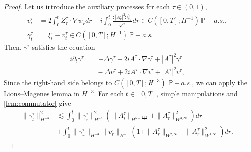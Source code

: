 \documentclass[a4paper,10pt]{amsart}
\newcommand{\wick}[1]{:\mathrel{#1}:}
\newcommand{\Bk}{\color{black}}
\newcommand{\Rd}{\color{red}}
\theoremstyle{remark}
\numberwithin{equation}{section}
\begin{document}
\begin{proof}
    Let us introduce the auxiliary processes for each $\tau \in (0,1),$  
    \begin{align*}
        v^{\tau}_t&=2\int_0^t Z^{\tau}_r\cdot\nabla\bar{\psi}_r dr-i\int_0^t \frac{\wick{|A^\tau_r|^2}\bar{\psi}_r}{\sqrt{\tau}} dr\in C([0,T];H^{-1})\ \mathbb{P}-a.s.,\\
        \gamma^{\tau}_t&=\xi^{\tau}_t-v^{\tau}_t\in C([0,T];H^{-1})\ \mathbb{P}-a.s.
    \end{align*}
    Then, $\gamma^{\tau}$ satisfies the equation
    \begin{align*}
        i\partial_t\gamma^{\tau}
        &=-\Delta\gamma^{\tau}+2iA^{\tau}\cdot\nabla\gamma^{\tau}
        +|A^\tau|^2\gamma^{\tau}\\
        &\quad-\Delta v^{\tau}+2iA^{\tau}\cdot\nabla v^{\tau}
        +|A^\tau|^2v^{\tau},
    \end{align*}
    Since the right-hand side belongs to $C([0,T];H^{-3})$
    $\mathbb{P}-a.s.$, we can apply the Lions--Magenes lemma in $H^{-3}$.
    For each $t\in[0,T]$, simple manipulations and
    \cref{lem:commutator} give
    \begin{align*}
        \|\gamma^{\tau}_t\|_{H^{-3}}^2& \lesssim \int_0^t  \|\gamma^{\tau}_r\|_{H^{-3}}^2 \left(\|A^\tau_r\|_{H^{5+\frac{d+\theta}{2}}}+\|A^\tau_r\|^2_{W^{3,\infty}}\right) dr\\ & +\int_0^t \|\gamma^{\tau}_r\|_{H^{-3}}\|v^{\tau}_r\|_{H^{-1}}\left(1+\|A^\tau_r\|_{W^{2,\infty}}+\|A^\tau_r\|_{W^{1,\infty}}^2\right) dr.

\end{align*}
\end{proof}
\end{document}
